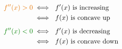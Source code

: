\documentclass[handout]{beamer}
\begin{document}
{{    \begin{mdframed}[style=FactStyle]
      \vspace*{-1.25em}
      \begin{align*}
        {\color{orange!90!black}f''(x) > 0} 
        & \iff\ \text{$f'(x)$\ is increasing} \\
        & \iff\ \text{$f(x)$\ is concave up} \\[0.5em]
        {\color{green!50!black}f''(x) < 0}
        & \iff\ \text{$f'(x)$\ is decreasing} \\
        & \iff\ \text{$f(x)$\ is concave down} 
      \end{align*}
    \end{mdframed}
  }
  \vspace*{3in}

}
\end{document}
